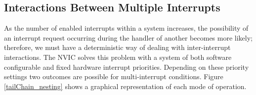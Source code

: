 \documentclass[11pt,fleqn]{book} %
\makeatletter
\newcommand{\ilcode}[1]{
    \smallskip
    \colorbox{gray!20!white}{
        \centering
        \parbox{\linewidth-2\fboxsep}{
            \lstinline@#1@
        }
    }
}
\makeatother
\begin{document}


\subsection{Interactions Between Multiple Interrupts}
As the number of enabled interrupts within a system increases, the possibility of an interrupt request occurring during the handler of another becomes more likely; therefore, we must have a deterministic way of dealing with inter-interrupt interactions. The NVIC solves this problem with a system of both software configurable and fixed hardware interrupt priorities. Depending on these priority settings two outcomes are possible for multi-interrupt conditions. Figure \vref{tailChain_nesting} shows a graphical representation of each mode of operation.
\end{document}
